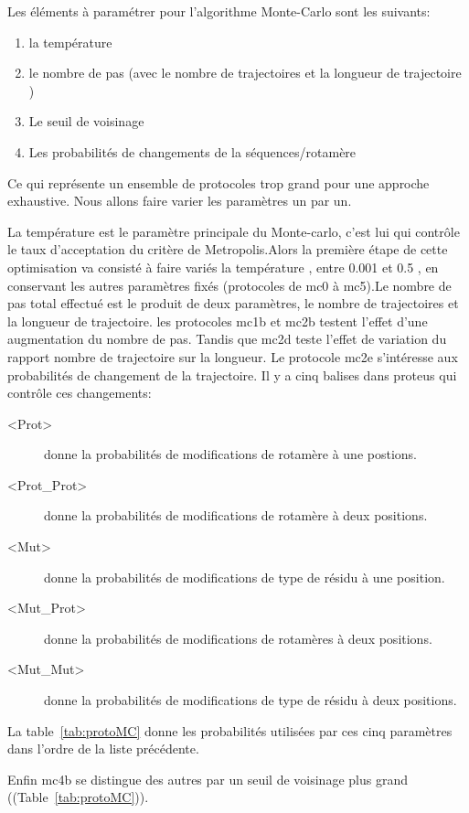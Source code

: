 Les éléments à paramétrer pour l'algorithme Monte-Carlo sont les suivants:

\begin{enumerate}
\item la température
\item le nombre de pas (avec le nombre de trajectoires et la longueur de trajectoire )
\item Le seuil de voisinage
\item Les probabilités de changements de la séquences/rotamère
\end{enumerate}

Ce qui représente un ensemble de protocoles trop grand pour une approche exhaustive. Nous allons faire varier les paramètres un par un.

La température est le paramètre principale du Monte-carlo, c'est lui qui contrôle le taux d'acceptation du critère de Metropolis.Alors la première étape de cette optimisation va consisté à faire variés la température , entre 0.001 et 0.5 , en conservant les autres paramètres fixés (protocoles de mc0 à mc5).Le nombre de pas total effectué est le produit de deux paramètres, le nombre de trajectoires et la longueur de trajectoire. les protocoles mc1b et mc2b testent l'effet d'une augmentation du nombre de pas. Tandis que mc2d teste l'effet de variation du rapport nombre de trajectoire sur la longueur.
Le protocole mc2e s'intéresse aux probabilités de changement de la trajectoire. Il y a cinq balises dans proteus qui contrôle ces changements:

\begin{description}
\item[<Prot>] donne la probabilités de modifications de  rotamère à une postions.
\item[<Prot\_Prot>] donne la probabilités de modifications de  rotamère à deux positions.
\item[<Mut>] donne la probabilités de modifications de type de résidu à une position.
\item[<Mut\_Prot>] donne la probabilités de modifications de  rotamères à deux positions.
\item[<Mut\_Mut>] donne la probabilités de modifications de type de résidu à deux positions.
\end{description}

La table~\ref{tab:protoMC} donne les probabilités utilisées par ces cinq paramètres dans l'ordre de la liste précédente. 

 Enfin mc4b se distingue des autres par un seuil de voisinage plus grand ((Table~\ref{tab:protoMC})).


